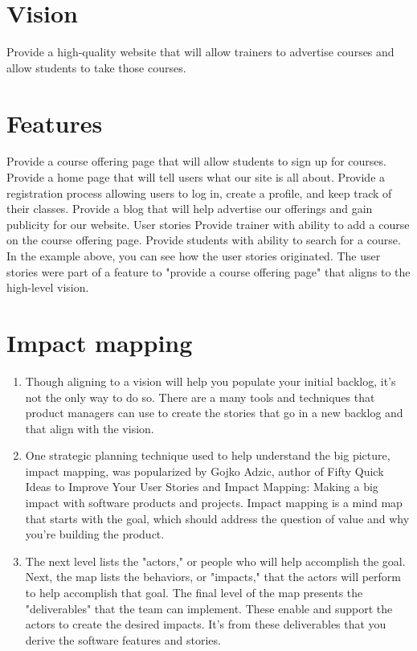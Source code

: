 \section{Vision}
Provide a high-quality website that will allow trainers to advertise courses and allow students to take those courses. 

\section{Features}
Provide a course offering page that will allow students to sign up for courses.
Provide a home page that will tell users what our site is all about.
Provide a registration process allowing users to log in, create a profile, and keep track of their classes.
Provide a blog that will help advertise our offerings and gain publicity for our website.
User stories
Provide trainer with ability to add a course on the course offering page.
Provide students with ability to search for a course.
In the example above, you can see how the user stories originated. The user stories were part of a feature to "provide a course offering page" that aligns to the high-level vision.

\section{Impact mapping}
\begin{enumerate}
    \item Though aligning to a vision will help you populate your initial backlog, it's not the only way to do so. There are a many tools and techniques that product managers can use to create the stories that go in a new backlog and that align with the vision.
    
    \item One strategic planning technique used to help understand the big picture, impact mapping, was popularized by Gojko Adzic, author of Fifty Quick Ideas to Improve Your User Stories and Impact Mapping: Making a big impact with software products and projects. Impact mapping is a mind map that starts with the goal, which should address the question of value and why you're building the product.
    
    \item The next level lists the "actors," or people who will help accomplish the goal. Next, the map lists the behaviors, or "impacts," that the actors will perform to help accomplish that goal. The final level of the map presents the "deliverables" that the team can implement. These enable and support the actors to create the desired impacts. It's from these deliverables that you derive the software features and stories.
    
\end{enumerate}

